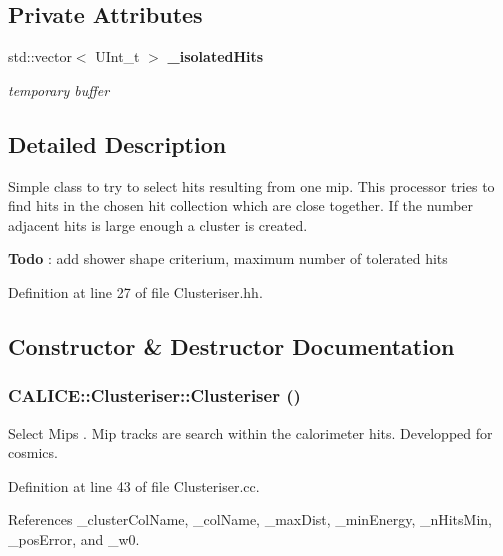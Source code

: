 \subsection*{Private Attributes}
\begin{DoxyCompactItemize}
\item 
std::vector$<$ UInt\_\-t $>$ {\bf \_\-isolatedHits}\label{classCALICE_1_1Clusteriser_ad87b17caeede7031aa2b2e0c4dac5f53}

\begin{DoxyCompactList}\small\item\em temporary buffer \item\end{DoxyCompactList}\end{DoxyCompactItemize}


\subsection{Detailed Description}
Simple class to try to select hits resulting from one mip. This processor tries to find hits in the chosen hit collection which are close together. If the number adjacent hits is large enough a cluster is created. \begin{Desc}
\item[{\bf Todo}]: add shower shape criterium, maximum number of tolerated hits \end{Desc}


Definition at line 27 of file Clusteriser.hh.

\subsection{Constructor \& Destructor Documentation}
\subsubsection[{Clusteriser}]{\setlength{\rightskip}{0pt plus 5cm}CALICE::Clusteriser::Clusteriser ()}\label{classCALICE_1_1Clusteriser_af90511eeaaf5a849272c290935a9d5a2}


Select Mips . Mip tracks are search within the calorimeter hits. Developped for cosmics. 

Definition at line 43 of file Clusteriser.cc.

References \_\-clusterColName, \_\-colName, \_\-maxDist, \_\-minEnergy, \_\-nHitsMin, \_\-posError, and \_\-w0.

